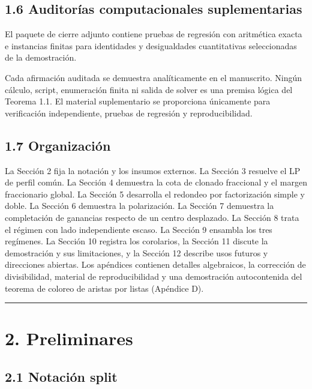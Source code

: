 \documentclass[
  11pt,
]{article}
\begin{document}
\subsection{1.6 Auditorías computacionales
suplementarias}\label{auditoruxedas-computacionales-suplementarias}

El paquete de cierre adjunto contiene pruebas de regresión con
aritmética exacta e instancias finitas para identidades y desigualdades
cuantitativas seleccionadas de la demostración.

Cada afirmación auditada se demuestra analíticamente en el manuscrito.
Ningún cálculo, script, enumeración finita ni salida de solver es una
premisa lógica del Teorema 1.1. El material suplementario se proporciona
únicamente para verificación independiente, pruebas de regresión y
reproducibilidad.

\subsection{1.7 Organización}\label{organizaciuxf3n}

La Sección 2 fija la notación y los insumos externos. La Sección 3
resuelve el LP de perfil común. La Sección 4 demuestra la cota de
clonado fraccional y el margen fraccionario global. La Sección 5
desarrolla el redondeo por factorización simple y doble. La Sección 6
demuestra la polarización. La Sección 7 demuestra la completación de
ganancias respecto de un centro desplazado. La Sección 8 trata el
régimen con lado independiente escaso. La Sección 9 ensambla los tres
regímenes. La Sección 10 registra los corolarios, la Sección 11 discute
la demostración y sus limitaciones, y la Sección 12 describe usos
futuros y direcciones abiertas. Los apéndices contienen detalles
algebraicos, la corrección de divisibilidad, material de
reproducibilidad y una demostración autocontenida del teorema de coloreo
de aristas por listas (Apéndice D).

\begin{center}\rule{0.5\linewidth}{0.5pt}\end{center}

\section{2. Preliminares}\label{preliminares}

\subsection{2.1 Notación split}\label{notaciuxf3n-split}
\end{document}
